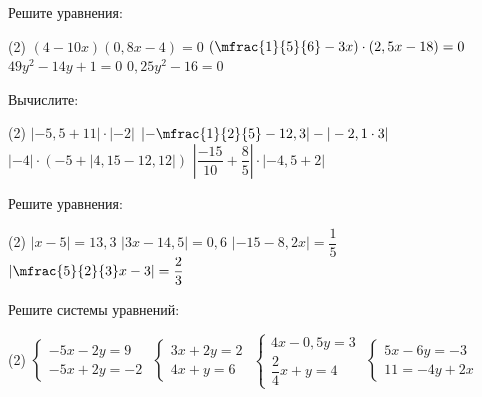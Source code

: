 \begin{exam}
	\begin{listofex}
		
		\item Решите уравнения:
		\begin{tasks}(2)
			\task \( (4-10x)(0,8x-4)=0 \)
			\task \( \left( \mfrac{ 1}{5 }{6 }-3x \right) \cdot (2,5x-18)=0 \)
			\task \( 49y^2-14y+1=0 \)
			\task \( 0,25y^2-16=0 \)
		\end{tasks}
		\item Вычислите:
		\begin{tasks}(2)
			\task \( |-5,5+11| \cdot |-2| \)
			\task \( \left| -\mfrac{1 }{2 }{5 } - 12,3 \right|-|-2,1 \cdot 3| \)
			\task \( |-4|\cdot(-5 + |4,15-12,12|) \)
			\task \( \left| \dfrac{ -15 }{ 10 }+\dfrac{ 8 }{ 5 } \right| \cdot |-4,5+2| \)
		\end{tasks}
		\item Решите уравнения:
		\begin{tasks}(2)
			\task \( |x-5|=13,3 \)
			\task \( |3x-14,5|=0,6 \)
			\task \( |-15-8,2x|=\dfrac{ 1 }{ 5 } \)
			\task \( \left| \mfrac{5 }{2 }{3 }x-3 \right|=\dfrac{ 2 }{ 3 } \)
		\end{tasks}
		\item Решите системы уравнений:
		\begin{tasks}(2)
			\task \( \begin{cases} -5x-2y=9 \\ -5x+2y=-2 \end{cases} \)
			\task \( \begin{cases} 3x+2y=2 \\ 4x+y=6 \end{cases} \)
			\task \( \begin{cases} 4x-0,5y=3 \\ \dfrac{ 2 }{ 4 }x+y=4 \end{cases} \)
			\task \( \begin{cases} 5x-6y=-3 \\ 11=-4y+2x \end{cases} \)
		\end{tasks}
	\end{listofex}
\end{exam}
